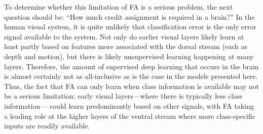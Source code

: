To determine whether this limitation of FA is a serious problem,
the next question should be: ``How much credit assignment is required in a brain?''
In the human visual system,
it is quite unlikely that classification error
is the only error signal available to the system.
Not only do earlier visual layers likely learn at least partly
based on features more associated with the dorsal stream (such as depth and motion),
but there is likely unsupervised learning happening at many layers.
Therefore, the amount of supervised deep learning that occurs in the brain
is almost certainly not as all-inclusive as is the case
in the models presented here.
Thus, the fact that FA can only learn when class information is available
may not be a serious limitation:
early visual layers---where there is typically less class information---%
could learn predominantly based on other signals,
with FA taking a leading role at the higher layers of the ventral stream
where more class-specific inputs are readily available.

